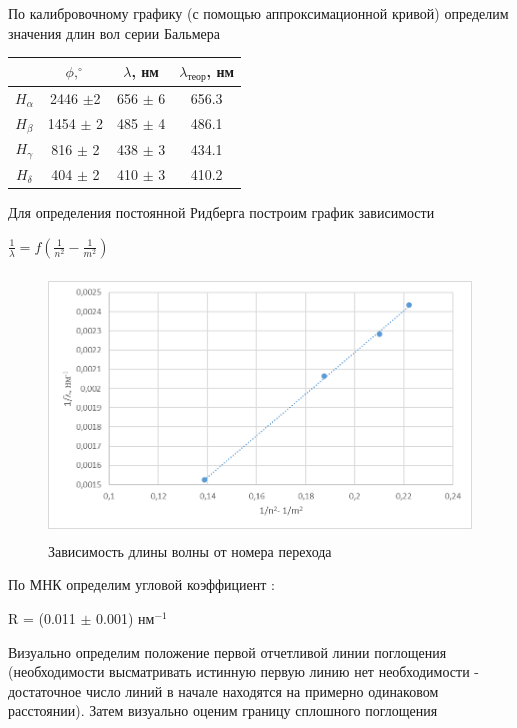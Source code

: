 \documentclass[12pt,a4paper]{article}
\begin{document}
По калибровочному графику (с помощью аппроксимационной кривой) определим значения длин вол серии Бальмера

\begin{center}
\begin{tabular}{|c|c|c|c|}
\hline 
 & $\phi, ^\circ$ & $\lambda$, нм & $\lambda_\text{теор}$, нм \\ 
\hline 
$H_\alpha$ & 2446 $\pm$2 & 656 $\pm$ 6 & 656.3 \\ 
\hline 
$H_\beta$ & 1454 $\pm$ 2 & 485 $\pm$ 4 & 486.1 \\ 
\hline 
$H_\gamma$ & 816 $\pm$ 2 & 438 $\pm$ 3 & 434.1 \\ 
\hline 
$H_\delta$ & 404 $\pm$ 2 & 410 $\pm$ 3 & 410.2 \\ 
\hline 
\end{tabular} 
\end{center}

Для определения постоянной Ридберга построим график зависимости

\begin{large}
$\frac{1}{\lambda}=f(\frac{1}{n^2} - \frac{1}{m^2} )$
\end{large}

\begin{figure}[H]
	\begin{center}
		\includegraphics[width=14cm, height = 7cm]{5.2.2-2}
		\caption{Зависимость длины волны от номера перехода}
	\end{center}
\end{figure}

По МНК определим угловой коэффициент :

R = (0.011 $\pm$ 0.001) нм$^{-1}$

Визуально определим положение первой отчетливой линии поглощения (необходимости высматривать истинную первую линию нет необходимости - достаточное число линий в начале находятся на примерно одинаковом расстоянии). Затем визуально оценим границу сплошного поглощения
\end{document}
